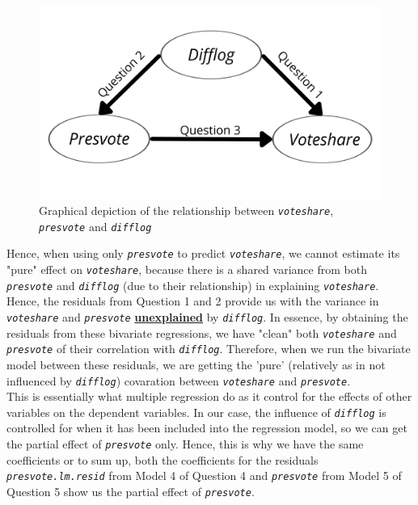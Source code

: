 \documentclass[12pt,letterpaper]{article}
\begin{document}
\begin{enumerate}
	\begin{figure}[H]\centering
		\caption{\footnotesize Graphical depiction of the relationship between \textit{\texttt{voteshare}}, \textit{\texttt{presvote}} and \textit{\texttt{difflog}}}
		\label{fig:plot_1}
		\includegraphics[width=.85\textwidth]{5. Variables relationship.png}
	\end{figure}
	\hspace*{15pt} Hence, when using only \textit{\texttt{presvote}} to predict   \textit{\texttt{voteshare}}, we cannot estimate its "pure" effect on \textit{\texttt{voteshare}}, because there is a shared variance from both \textit{\texttt{presvote}} and \textit{\texttt{difflog}} (due to their relationship) in explaining \textit{\texttt{voteshare}}. Hence, the residuals from Question 1 and 2 provide us with the variance in \textit{\texttt{voteshare}} and \textit{\texttt{presvote}} \textbf{\underline{unexplained}} by \textit{\texttt{difflog}}. In essence, by obtaining the residuals from these bivariate regressions, we have "clean" both \textit{\texttt{voteshare}} and \textit{\texttt{presvote}} of their correlation with \textit{\texttt{difflog}}. Therefore, when we run the bivariate model between these residuals, we are getting the 'pure' (relatively as in not influenced by \textit{\texttt{difflog}}) covaration between \textit{\texttt{voteshare}} and \textit{\texttt{presvote}}.\\
	\hspace*{15pt} This is essentially what multiple regression do as it control for the effects of other variables on the dependent variables. In our case, the influence of \textit{\texttt{difflog}} is controlled for when it has been included into the regression model, so we can get the partial effect of \textit{\texttt{presvote}} only. Hence, this is why we have the same coefficients or to sum up, both the coefficients for the residuals \textit{\texttt{presvote.lm.resid}} from Model 4 of Question 4 and \textit{\texttt{presvote}} from Model 5 of Question 5 show us the partial effect of \textit{\texttt{presvote}}.
	\end{enumerate}
\end{document}
